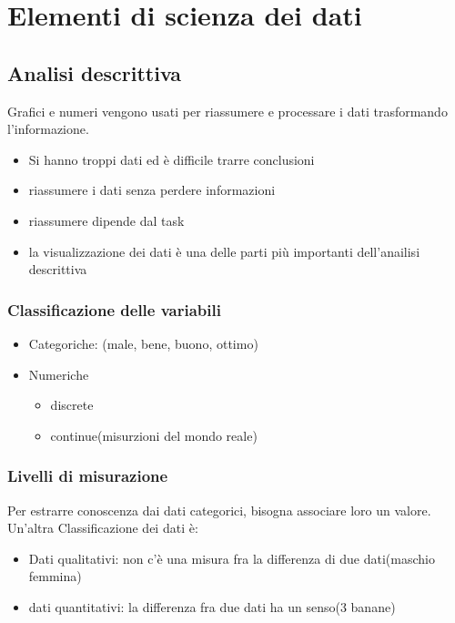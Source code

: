 \section{Elementi di scienza dei dati}

\subsection{Analisi descrittiva}
Grafici e numeri vengono usati per riassumere e processare i dati trasformando l'informazione.

\begin{itemize}
    \item Si hanno troppi dati ed è difficile trarre conclusioni
    \item riassumere i dati senza perdere informazioni
    \item riassumere dipende dal task
    \item la visualizzazione dei dati è una delle parti più importanti dell'anailisi descrittiva
\end{itemize}

\subsubsection{Classificazione delle variabili}
\begin{itemize}
    \item Categoriche: (male, bene, buono, ottimo)
    \item Numeriche
    \begin{itemize}
        \item discrete
        \item continue(misurzioni del mondo reale)
    \end{itemize}
\end{itemize}

\subsubsection{Livelli di misurazione}
Per estrarre conoscenza dai dati categorici, bisogna associare loro un valore.
Un'altra Classificazione dei dati è:
\begin{itemize}
    \item Dati qualitativi: non c'è una misura fra la differenza di due dati(maschio femmina)
    \item dati quantitativi: la differenza fra due dati ha un senso(3 banane)
\end{itemize}

